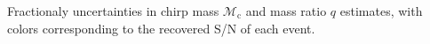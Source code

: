 \label{fig:mass_std_snr} Fractionaly uncertainties in chirp mass $\mathcal{M}_\mathrm{c}$ and mass ratio $q$ estimates, with colors corresponding to the recovered S/N of each event.
  
